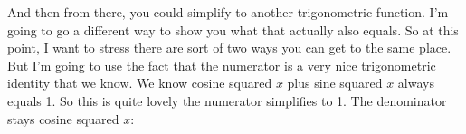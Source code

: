 \documentclass[pdftex, brazil, 12pt, twoside]{article}
\begin{document}
\begin{figure}[H]
  \begin{center}
  \end{center}
\end{figure}

And then from there, you could simplify
to another trigonometric function.
I'm going to go a different way to show you
what that actually also equals.
So at this point, I want to stress
there are sort of two ways you can get to the same place.
But I'm going to use the fact that the numerator is
a very nice trigonometric identity that we know.
We know cosine squared $x$ plus sine squared $x$ always equals 1.
So this is quite lovely the numerator simplifies to 1.
The denominator stays cosine squared $x$:

\begin{figure}[H]
  \begin{center}
  \end{center}
\end{figure}
\end{document}
